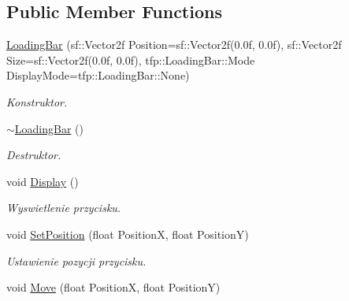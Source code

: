 \subsection*{Public Member Functions}
\begin{DoxyCompactItemize}
\item 
\mbox{\label{classtfp_1_1_loading_bar_aa4c90db6a8cd6972d2829e1c10747a55}} 
\mbox{\hyperlink{classtfp_1_1_loading_bar_aa4c90db6a8cd6972d2829e1c10747a55}{Loading\+Bar}} (sf\+::\+Vector2f Position=sf\+::\+Vector2f(0.\+0f, 0.\+0f), sf\+::\+Vector2f Size=sf\+::\+Vector2f(0.\+0f, 0.\+0f), tfp\+::\+Loading\+Bar\+::\+Mode Display\+Mode=tfp\+::\+Loading\+Bar\+::\+None)
\begin{DoxyCompactList}\small\item\em Konstruktor. \end{DoxyCompactList}\item 
\mbox{\label{classtfp_1_1_loading_bar_a1270bee80fa6af938d466ee20f5d8a70}} 
\mbox{\hyperlink{classtfp_1_1_loading_bar_a1270bee80fa6af938d466ee20f5d8a70}{$\sim$\+Loading\+Bar}} ()
\begin{DoxyCompactList}\small\item\em Destruktor. \end{DoxyCompactList}\item 
void \mbox{\hyperlink{classtfp_1_1_loading_bar_a172f4193878f9bb66af5e1307e6e434d}{Display}} ()
\begin{DoxyCompactList}\small\item\em Wyswietlenie przycisku. \end{DoxyCompactList}\item 
\mbox{\label{classtfp_1_1_loading_bar_a01f26ce4fc71ac52844797ebf36d1be9}} 
void \mbox{\hyperlink{classtfp_1_1_loading_bar_a01f26ce4fc71ac52844797ebf36d1be9}{Set\+Position}} (float PositionX, float PositionY)
\begin{DoxyCompactList}\small\item\em Ustawienie pozycji przycisku. \end{DoxyCompactList}\item 
\mbox{\label{classtfp_1_1_loading_bar_ad374e27fd26817c81b48c538ed72859b}} 
void \mbox{\hyperlink{classtfp_1_1_loading_bar_ad374e27fd26817c81b48c538ed72859b}{Move}} (float PositionX, float PositionY)

\end{DoxyCompactItemize}
